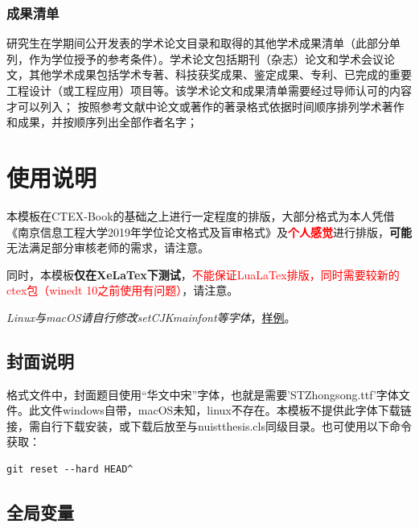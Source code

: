 \documentclass{nuistthesis}
\begin{document}
\subsection{成果清单}

研究生在学期间公开发表的学术论文目录和取得的其他学术成果清单（此部分单列，作为学位授予的参考条件）。学术论文包括期刊（杂志）论文和学术会议论文，其他学术成果包括学术专著、科技获奖成果、鉴定成果、专利、已完成的重要工程设计（或工程应用）项目等。该学术论文和成果清单需要经过导师认可的内容才可以列入；
按照参考文献中论文或著作的著录格式依据时间顺序排列学术著作和成果，并按顺序列出全部作者名字；


\chapter{使用说明}

本模板在CTEX-Book的基础之上进行一定程度的排版，大部分格式为本人凭借《南京信息工程大学\hspace{1em}2019年学位论文格式及盲审格式》\cite{NUIST_thesis}及\textcolor{red}{\bfseries 个人感觉}进行排版，{\bfseries 可能}无法满足部分审核老师的需求，请注意。

同时，本模板{\bfseries 仅在XeLaTex下测试}，\textcolor{red}{不能保证LuaLaTex排版，同时需要较新的ctex包（winedt 10之前使用有问题）}，请注意。

\emph{Linux与macOS请自行修改setCJKmainfont等字体}，\href{https://github.com/Alrash/NUIST_Master_Thesis/commit/2d3a8f87f851bca0390801666e175dcfbd8ca38e#diff-32916104d728632293a3e1b0532021c1R23-R39}{样例}。

\section{封面说明}

格式文件中，封面题目使用“华文中宋”字体，也就是需要'STZhongsong.ttf'字体文件。此文件windows自带，macOS未知，linux不存在。本模板不提供此字体下载链接，需自行下载安装，或下载后放至与nuistthesis.cls同级目录。也可使用以下命令获取：

\begin{lstlisting}
git reset --hard HEAD^
\end{lstlisting}


\section{全局变量}
\end{document}
